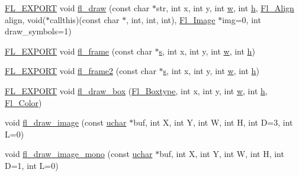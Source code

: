 \begin{DoxyCompactItemize}
\item 
\hyperlink{_fl___export_8_h_aa9ba29a18aee9d738370a06eeb4470fc}{F\+L\+\_\+\+E\+X\+P\+O\+RT} void \hyperlink{group__fl__drawings_ga21d4007e0096cfa9c9906ebb373fa8ee}{fl\+\_\+draw} (const char $\ast$str, int x, int y, int \hyperlink{forms_8_h_aac374e320caaadeca4874add33b62af2}{w}, int \hyperlink{forms_8_h_a7e427ba5b307f9068129699250690066}{h}, \hyperlink{_enumerations_8_h_a44e8bcd1e030e65e4f88cbae64a7c3e3}{Fl\+\_\+\+Align} align, void($\ast$callthis)(const char $\ast$, int, int, int), \hyperlink{class_fl___image}{Fl\+\_\+\+Image} $\ast$img=0, int draw\+\_\+symbols=1)
\item 
\hyperlink{_fl___export_8_h_aa9ba29a18aee9d738370a06eeb4470fc}{F\+L\+\_\+\+E\+X\+P\+O\+RT} void \hyperlink{group__fl__drawings_ga2e109cb030c3f2fbef45156c687b8138}{fl\+\_\+frame} (const char $\ast$\hyperlink{forms_8_h_a672b4f0a8c8a6db61068c721f799d87f}{s}, int x, int y, int \hyperlink{forms_8_h_aac374e320caaadeca4874add33b62af2}{w}, int \hyperlink{forms_8_h_a7e427ba5b307f9068129699250690066}{h})
\item 
\hyperlink{_fl___export_8_h_aa9ba29a18aee9d738370a06eeb4470fc}{F\+L\+\_\+\+E\+X\+P\+O\+RT} void \hyperlink{group__fl__drawings_gaaae63e60444c66e89a83111132507e16}{fl\+\_\+frame2} (const char $\ast$\hyperlink{forms_8_h_a672b4f0a8c8a6db61068c721f799d87f}{s}, int x, int y, int \hyperlink{forms_8_h_aac374e320caaadeca4874add33b62af2}{w}, int \hyperlink{forms_8_h_a7e427ba5b307f9068129699250690066}{h})
\item 
\hyperlink{_fl___export_8_h_aa9ba29a18aee9d738370a06eeb4470fc}{F\+L\+\_\+\+E\+X\+P\+O\+RT} void \hyperlink{group__fl__drawings_ga475ff2bbcafeb30d4551f635e42d6259}{fl\+\_\+draw\+\_\+box} (\hyperlink{_enumerations_8_h_ae48bf9070f8541de17829f54ccacc6bc}{Fl\+\_\+\+Boxtype}, int x, int y, int \hyperlink{forms_8_h_aac374e320caaadeca4874add33b62af2}{w}, int \hyperlink{forms_8_h_a7e427ba5b307f9068129699250690066}{h}, \hyperlink{_enumerations_8_h_a8b762953646f8abee866061f1af78a6a}{Fl\+\_\+\+Color})
\item 
void \hyperlink{group__fl__drawings_gaf9ad52880174bae01461adfa5b4020ff}{fl\+\_\+draw\+\_\+image} (const \hyperlink{fl__types_8h_a65f85814a8290f9797005d3b28e7e5fc}{uchar} $\ast$buf, int X, int Y, int W, int H, int D=3, int L=0)
\item 
void \hyperlink{group__fl__drawings_gafb938dc103b5c3d9187a538667237d36}{fl\+\_\+draw\+\_\+image\+\_\+mono} (const \hyperlink{fl__types_8h_a65f85814a8290f9797005d3b28e7e5fc}{uchar} $\ast$buf, int X, int Y, int W, int H, int D=1, int L=0)

\end{DoxyCompactItemize}
